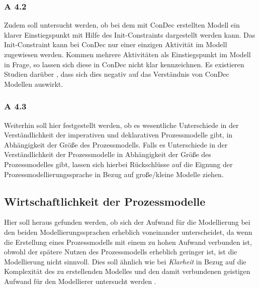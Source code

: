 \subsubsection{A 4.2}
Zudem soll untersucht werden, ob bei dem mit ConDec erstellten Modell ein klarer Einstiegspunkt mit Hilfe des Init-Constraints dargestellt werden kann. Das Init-Constraint kann bei ConDec nur einer einzigen Aktivität im Modell zugewiesen werden. Kommen mehrere Aktivitäten als Einstiegspunkt im Modell in Frage, so lassen sich diese in ConDec nicht klar kennzeichnen. Es existieren Studien darüber \cite{haisjackl2014understanding}, dass sich dies negativ auf das Verständnis von ConDec Modellen auswirkt. \newline

\subsubsection{A 4.3}
Weiterhin soll hier festgestellt werden, ob es wesentliche Unterschiede in der Verständlichkeit der imperativen und deklarativen Prozessmodelle gibt, in Abhängigkeit der Größe des Prozessmodells. Falls es Unterschiede in der Verständlichkeit der Prozessmodelle in Abhängigkeit der Größe des Prozessmodelles gibt, lassen sich hierbei Rückschlüsse auf die Eignung der Prozessmodellierungssprache in Bezug auf große/kleine Modelle ziehen.

\subsection{Wirtschaftlichkeit der Prozessmodelle}

Hier soll heraus gefunden werden, ob sich der Aufwand für die Modellierung bei den beiden Modellierungssprachen erheblich voneinander unterscheidet, da wenn die Erstellung eines Prozessmodells mit einem zu hohen Aufwand verbunden ist, obwohl der spätere Nutzen des Prozessmodells erheblich geringer ist, ist die Modellierung nicht sinnvoll. Dies soll ähnlich wie bei \textit{Klarheit} in Bezug auf die Komplexität des zu erstellenden Modelles und den damit verbundenen geistigen Aufwand für den Modellierer untersucht werden \cite{freund2007, journals95, leimeister2012,mendling2010seven}.\newline

